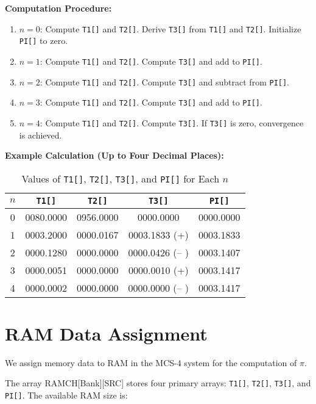 \vspace{1em}
\noindent \textbf{Computation Procedure:}
\begin{enumerate}
  \item $n = 0$: Compute \texttt{T1[]} and \texttt{T2[]}. Derive \texttt{T3[]} from \texttt{T1[]} and \texttt{T2[]}. Initialize \texttt{PI[]} to zero.
  \item $n = 1$: Compute \texttt{T1[]} and \texttt{T2[]}. Compute \texttt{T3[]} and add to \texttt{PI[]}.
  \item $n = 2$: Compute \texttt{T1[]} and \texttt{T2[]}. Compute \texttt{T3[]} and subtract from \texttt{PI[]}.
  \item $n = 3$: Compute \texttt{T1[]} and \texttt{T2[]}. Compute \texttt{T3[]} and add to \texttt{PI[]}.
  \item $n = 4$: Compute \texttt{T1[]} and \texttt{T2[]}. Compute \texttt{T3[]}. If \texttt{T3[]} is zero, convergence is achieved.
\end{enumerate}

\vspace{1em}
\noindent \textbf{Example Calculation (Up to Four Decimal Places):}

\begin{table}[h!]
\centering
\begin{tabular}{|c|c|c|c|c|}
\hline
$n$ & \texttt{T1[]} & \texttt{T2[]} & \texttt{T3[]} & \texttt{PI[]} \\
\hline
0 & 0080.0000 & 0956.0000 & 0000.0000 & 0000.0000 \\
1 & 0003.2000 & 0000.0167 & 0003.1833 (+) & 0003.1833 \\
2 & 0000.1280 & 0000.0000 & 0000.0426 (-- ) & 0003.1407 \\
3 & 0000.0051 & 0000.0000 & 0000.0010 (+) & 0003.1417 \\
4 & 0000.0002 & 0000.0000 & 0000.0000 (-- ) & 0003.1417 \\
\hline
\end{tabular}
\caption{Values of \texttt{T1[]}, \texttt{T2[]}, \texttt{T3[]}, and \texttt{PI[]} for Each $n$}
\end{table}

\section{RAM Data Assignment}
We assign memory data to RAM in the MCS-4 system for the computation of $\pi$.

The array RAMCH[Bank][SRC] stores four primary arrays: \texttt{T1[]}, \texttt{T2[]}, \texttt{T3[]}, and \texttt{PI[]}. The available RAM size is:

